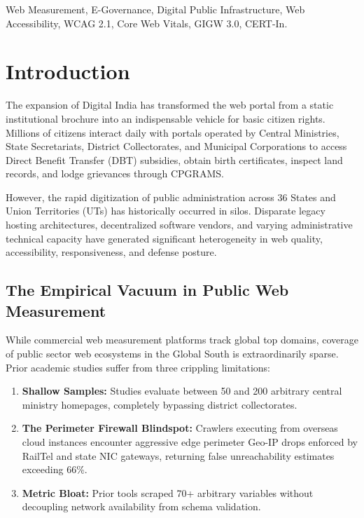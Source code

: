 \documentclass[conference]{IEEEtran}
\begin{document}
\begin{IEEEkeywords}
Web Measurement, E-Governance, Digital Public Infrastructure, Web Accessibility, WCAG 2.1, Core Web Vitals, GIGW 3.0, CERT-In.
\end{IEEEkeywords}

\section{Introduction}
The expansion of Digital India has transformed the web portal from a static institutional brochure into an indispensable vehicle for basic citizen rights. Millions of citizens interact daily with portals operated by Central Ministries, State Secretariats, District Collectorates, and Municipal Corporations to access Direct Benefit Transfer (DBT) subsidies, obtain birth certificates, inspect land records, and lodge grievances through CPGRAMS.

However, the rapid digitization of public administration across 36 States and Union Territories (UTs) has historically occurred in silos. Disparate legacy hosting architectures, decentralized software vendors, and varying administrative technical capacity have generated significant heterogeneity in web quality, accessibility, responsiveness, and defense posture.

\subsection{The Empirical Vacuum in Public Web Measurement}
While commercial web measurement platforms track global top domains, coverage of public sector web ecosystems in the Global South is extraordinarily sparse. Prior academic studies suffer from three crippling limitations:
\begin{enumerate}
    \item \textbf{Shallow Samples:} Studies evaluate between 50 and 200 arbitrary central ministry homepages, completely bypassing district collectorates.
    \item \textbf{The Perimeter Firewall Blindspot:} Crawlers executing from overseas cloud instances encounter aggressive edge perimeter Geo-IP drops enforced by RailTel and state NIC gateways, returning false unreachability estimates exceeding 66\%.
    \item \textbf{Metric Bloat:} Prior tools scraped 70+ arbitrary variables without decoupling network availability from schema validation.
\end{enumerate}
\end{document}
